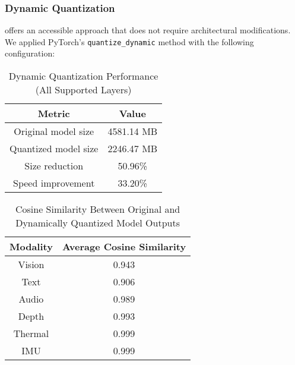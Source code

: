 \documentclass[runningheads]{IEEEtran}
\begin{document}
\subsubsection{Dynamic Quantization}
offers an accessible approach that does not require architectural modifications. We applied PyTorch's \texttt{quantize\_dynamic} method with the following configuration:


\begin{table}[ht]
\caption{Dynamic Quantization Performance (All Supported Layers)}
\label{tab:dynamic_quant_all}
\centering
\begin{tabular}{|c|c|}
\hline
\textbf{Metric} & \textbf{Value} \\
\hline
Original model size & 4581.14 MB \\
Quantized model size & 2246.47 MB \\
Size reduction & 50.96\% \\
Speed improvement & 33.20\% \\
\hline
\end{tabular}
\end{table}


\begin{table}[ht]
\caption{Cosine Similarity Between Original and Dynamically Quantized Model Outputs}
\label{tab:dynamic_quant_cosine}
\centering
\begin{tabular}{|c|c|}
\hline
\textbf{Modality} & \textbf{Average Cosine Similarity} \\
\hline
Vision & 0.943 \\
Text & 0.906 \\
Audio & 0.989 \\
Depth & 0.993 \\
Thermal & 0.999 \\
IMU & 0.999 \\
\hline
\end{tabular}
\end{table}
\end{document}
